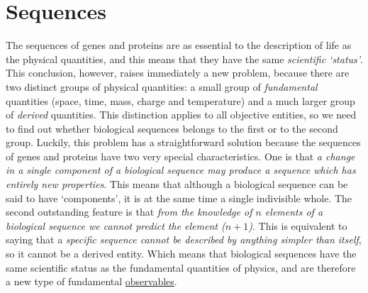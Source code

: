 \documentclass[12pt]{article}
\begin{document}
\hypertarget{sequences}{}
\section{Sequences}
The sequences of genes and proteins are as essential to the description of life as the \hypertarget{physical_quantities}{physical quantities}, and this means that they have the same \textit{scientific `status'}. This conclusion, however, raises immediately a new problem, because there are two distinct groups of physical quantities: a small group of \textit{fundamental} quantities (space, time, mass, charge and temperature) and a much larger group of \textit{derived} quantities. This distinction applies to all objective entities, so we need to find out whether biological sequences belongs to the first or to the second group. Luckily, this problem has a straightforward solution because the sequences of genes and proteins have two very special characteristics. One is that \textit{a change in a single component of a biological sequence may produce a sequence which has entirely new properties}. This means that although a biological sequence can be said to have `components', it is at the same time a single indivisible whole. The second outstanding feature is that \textit{from the knowledge of $n$ elements of a biological sequence we cannot predict the element ($n+1$)}. This is equivalent to saying that a \textit{specific sequence cannot be described by anything simpler than itself}, so it cannot be a derived entity. Which means that biological sequences have the same scientific status as the fundamental quantities of physics, and are therefore a new type of fundamental \hyperlink{observables}{observables}. 


\hypertarget{signs}{}
\end{document}
